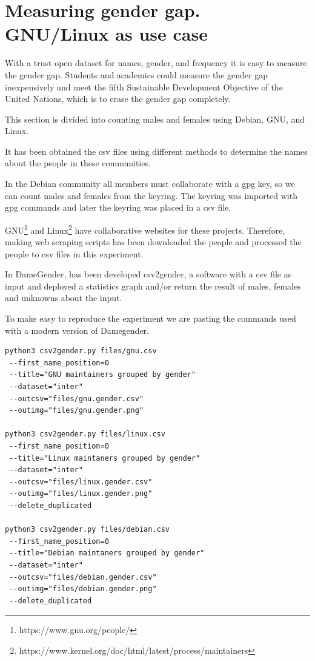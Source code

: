 \documentclass[a4paper]{article}
\begin{document}
\section{Measuring gender gap. GNU/Linux as use case}
\label{sec:measuring}

With a trust open dataset for names, gender, and frequency it is
easy to measure the gender gap. Students and academics could
measure the gender gap inexpensively and meet the fifth
Sustainable Development Objective of the United Nations,
which is to erase the gender gap completely. 

This section is divided into counting males and females using
Debian, GNU, and Linux.

It has been obtained the csv files using different methods
to determine the names about the people in these communities.

In the Debian community all members must collaborate with
a gpg key, so we can count males and females from the keyring.
The keyring was imported with gpg commands and later 
the keyring was placed in a csv file.

GNU\footnote{https://www.gnu.org/people/} and
Linux\footnote{https://www.kernel.org/doc/html/latest/process/maintainers}
have collaborative websites for these projects. Therefore, making web
scraping scripts has been downloaded the people and processed
the people to csv files in this experiment.

In DameGender, has been developed csv2gender, a software with a csv
file as input and deployed a statistics graph and/or return the result
of males, females and unknowns about the input.

To make easy to reproduce the experiment we are pasting the commands
used with a modern version of Damegender.

\begin{verbatim}
python3 csv2gender.py files/gnu.csv
 --first_name_position=0
 --title="GNU maintainers grouped by gender"
 --dataset="inter"
 --outcsv="files/gnu.gender.csv"
 --outimg="files/gnu.gender.png"

python3 csv2gender.py files/linux.csv
 --first_name_position=0
 --title="Linux maintaners grouped by gender"
 --dataset="inter"
 --outcsv="files/linux.gender.csv"
 --outimg="files/linux.gender.png"
 --delete_duplicated

python3 csv2gender.py files/debian.csv
 --first_name_position=0
 --title="Debian maintaners grouped by gender"
 --dataset="inter"
 --outcsv="files/debian.gender.csv"
 --outimg="files/debian.gender.png"
 --delete_duplicated
\end{verbatim}
\end{document}
